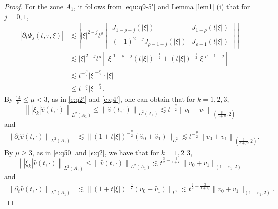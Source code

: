 \documentclass[11pt,twoside]{article}
\newcommand{\p}{\partial}
\newcommand{\f}{\frac}
\theoremstyle{plain}
\theoremstyle{definition}
\theoremstyle{remark}
\numberwithin{equation}{section}
\begin{document}
\begin{proof}
For the zone $A_1$, it follows from \eqref{equ:q9-5'} and  Lemma \ref{lem1} (i) that for $j=0,1$,
\begin{equation}\label{e:q54}
\begin{aligned}
|\p_t\Psi_j(t,\tau,\xi)|
&\lesssim\left| |\xi|^{2-j} t^{\rho}
\begin{vmatrix}
J_{1-\rho-j}(|\xi|) & J_{1-\rho}(t|\xi|) \\
(-1)^{2-j}J_{\rho-1+j}(|\xi|) & J_{\rho-1}(t|\xi|)
\end{vmatrix} \right|\\
&\lesssim |\xi|^{2-j} t^{\rho}\left[|\xi|^{1-\rho-j}(t|\xi|)^{-\f12}+(t|\xi|)^{-\f12}|\xi|^{\rho-1+j}\right]\\
&\lesssim t^{-\f{\mu}{2}}|\xi|^{-\f{\mu}{2}}\cdot|\xi|\\
&\leq t^{-\f{\mu}{2}}|\xi|^{-\f{\mu}{2}}.
\end{aligned}
\end{equation}
By  $\f{14}{5}\leq\mu<3$, as in \eqref{e:q2'} and \eqref{e:q4'}, one can obtain that for $k=1, 2, 3$,
\begin{equation}\label{e:q55}
\left\||\xi_k|\hat{v}(t, \cdot)\right\|_{L^2(A_1)}\leq\left\|\hat{v}(t, \cdot)\right\|_{L^2(A_1)}
\lesssim  t^{-\f{\mu}{2}}\left\|v_0+v_1\right\|_{(\f{6}{3+\mu}, 2)}
\end{equation}
and
\begin{equation}\label{e:q56}
\begin{aligned}
\left\|\p_t\hat{v}(t, \cdot)\right\|_{L^2(A_1)} & \lesssim \big\|(1+t|\xi|)^{-\f{\mu}{2}}(\hat{v}_{0}+\hat{v}_{1})\big\|_{L^{2}} \lesssim t^{-\f{\mu}{2}}\left\|v_0+v_1\right\|_{(\f{6}{3+\mu}, 2)}.
\end{aligned}
\end{equation}
By  $\mu\geq3$, as in \eqref{e:q50} and \eqref{e:q2}, we have that for $k=1, 2, 3$,
\begin{equation}\label{e:q55}
\left\||\xi_k|\hat{v}(t, \cdot)\right\|_{L^2(A_1)}\leq\left\|\hat{v}(t, \cdot)\right\|_{L^2(A_1)}
\lesssim  t^{\f32-\f{3}{1+\varepsilon_1}}\|v_0+v_1\|_{(1+\varepsilon_1, 2)}
\end{equation}
and
\begin{equation}\label{e:q56}
\begin{aligned}
\left\|\p_t\hat{v}(t, \cdot)\right\|_{L^2(A_1)} & \lesssim \big\|(1+t|\xi|)^{-\f32}(\hat{v}_{0}+\hat{v}_{1})\big\|_{L^{2}} \lesssim t^{\f32-\f{3}{1+\varepsilon_1}}\|v_0+v_1\|_{(1+\varepsilon_1, 2)}.
\end{aligned}
\end{equation}



\end{proof}
\end{document}
